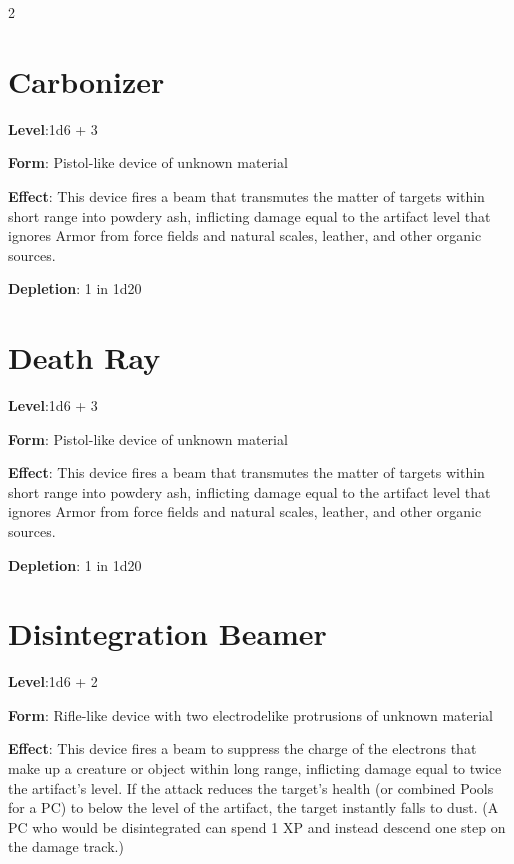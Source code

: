 \begin{multicols}{2}
\section{Carbonizer}

\textbf{Level}:1d6 + 3 

\textbf{Form}: Pistol-like device of unknown material 

\textbf{Effect}: This device fires a beam that transmutes the matter of targets within short range into powdery ash, inflicting damage equal to the artifact level that ignores Armor from force fields and natural scales, leather, and other organic sources. 

\textbf{Depletion}: 1 in 1d20

\section{Death Ray}

\textbf{Level}:1d6 + 3 

\textbf{Form}: Pistol-like device of unknown material 

\textbf{Effect}: This device fires a beam that transmutes the matter of targets within short range into powdery ash, inflicting damage equal to the artifact level that ignores Armor from force fields and natural scales, leather, and other organic sources. 

\textbf{Depletion}: 1 in 1d20

\section{Disintegration Beamer}

\textbf{Level}:1d6 + 2 

\textbf{Form}: Rifle-like device with two electrodelike protrusions of unknown material 

\textbf{Effect}: This device fires a beam to suppress the charge of the electrons that make up a creature or object within long range, inflicting damage equal to twice the artifact’s level. If the attack reduces the target’s health (or combined Pools for a PC) to below the level of the artifact, the target instantly falls to dust. (A PC who would be disintegrated can spend 1 XP and instead descend one step on the damage track.) 


\end{multicols}
